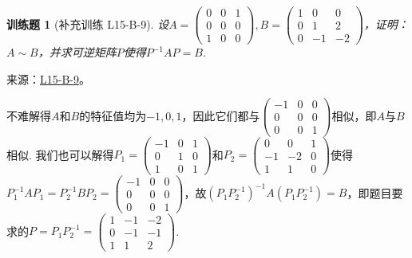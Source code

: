 \documentclass[UTF8,12pt,a4paper,fontset=fandol]{ctexart}
\newtheorem{exercise}{训练题}[section]
\begin{document}
\begin{exercise}[补充训练 L15-B-9]\label{prob:L15-B-9}
设$A=\begin{pmatrix}
                0 & 0 & 1 \\ 0 & 0 & 0 \\ 1 & 0 & 0
            \end{pmatrix},B=\begin{pmatrix}
                1 & 0 & 0 \\ 0 & 1 & 2 \\ 0 & -1 & -2
            \end{pmatrix}$，证明：$A\sim B$，并求可逆矩阵$P$使得$P^{-1}AP=B$.
\end{exercise}
\noindent 来源：\href{https://github.com/yhwu-is/Linear-Algebra-Left-Undone/blob/new/%E8%AE%B2%E4%B9%89/%E4%B8%93%E9%A2%98/15%20%E7%9B%B8%E4%BC%BC%E6%A0%87%E5%87%86%E5%BD%A2%EF%BC%9A%E5%A4%8D%E6%95%B0%E5%9F%9F%E4%B8%8A%E7%9A%84%E5%B0%9D%E8%AF%95%E4%B8%8E%E7%90%86%E8%AE%BA.tex}{L15-B-9}。
\begin{solve}
不难解得$A$和$B$的特征值均为$-1,0,1$，因此它们都与$\begin{pmatrix}
                -1 & 0 & 0 \\ 0 & 0 & 0 \\ 0 & 0 & 1
            \end{pmatrix}$相似，即$A$与$B$相似. 我们也可以解得$P_1=\begin{pmatrix}
                -1 & 0 & 1 \\ 0 & 1 & 0 \\ 1 & 0 & 1
            \end{pmatrix}$和$P_2=\begin{pmatrix}
                0 & 0 & 1 \\ -1 & -2 & 0 \\ 1 & 1 & 0
            \end{pmatrix}$使得$P_1^{-1}AP_1=P_2^{-1}BP_2=\begin{pmatrix}
                -1 & 0 & 0 \\ 0 & 0 & 0 \\ 0 & 0 & 1
            \end{pmatrix}$，故$(P_1P_2^{-1})^{-1}A(P_1P_2^{-1})=B$，即题目要求的$P=P_1P_2^{-1}=\begin{pmatrix}
                1 & -1 & -2 \\ 0 & -1 & -1 \\ 1 & 1 & 2
            \end{pmatrix}$.
\end{solve}
\end{document}
